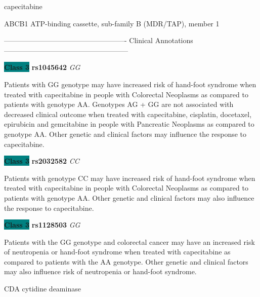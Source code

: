 \documentclass{resume} %
\begin{document}
\begin{rSection}{ capecitabine }
\begin{rSubsection}{ ABCB1 }{ ATP-binding cassette, sub-family B (MDR/TAP), member 1 }{}{}
\item[] ---------------------------------------------------- Clinical Annotations -----------------------------------------------------\newline
\item \textbf{\colorbox{teal} {Class 3}} \textbf{ rs1045642 } \textit{ GG }
\item[] Patients with GG genotype may have increased risk of hand-foot syndrome when treated with capecitabine in people with Colorectal Neoplasms as compared to patients with genotype AA. Genotypes AG + GG are not associated with decreased clinical outcome when treated with capecitabine, cisplatin, docetaxel, epirubicin and gemcitabine in people with Pancreatic Neoplasms as compared to genotype AA. Other genetic and clinical factors may influence the response to capecitabine.\item \textbf{\colorbox{teal} {Class 3}} \textbf{ rs2032582 } \textit{ CC }
\item[] Patients with genotype CC may have increased risk of hand-foot syndrome when treated with capecitabine in people with Colorectal Neoplasms as compared to patients with genotype AA. Other genetic and clinical factors may also influence the response to capecitabine.\item \textbf{\colorbox{teal} {Class 3}} \textbf{ rs1128503 } \textit{ GG }
\item[] Patients with the GG genotype and colorectal cancer may have an increased risk of neutropenia or hand-foot syndrome when treated with capecitabine as compared to patients with the AA genotype. Other genetic and clinical factors may also influence risk of neutropenia or hand-foot syndrome.
\end{rSubsection}\begin{rSubsection}{ CDA }{ cytidine deaminase }{}{}
\item[]


\end{rSubsection}
\end{rSection}
\end{document}
